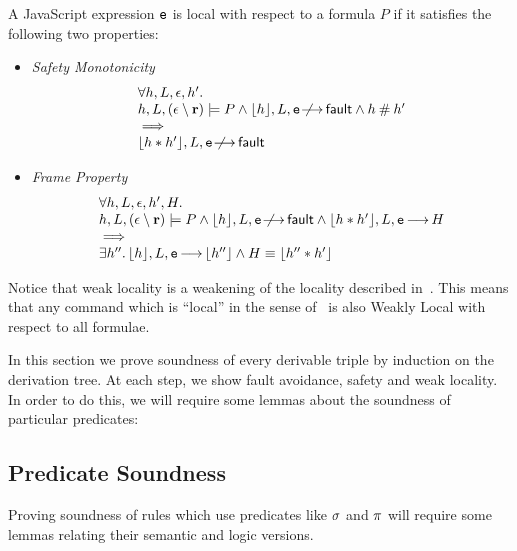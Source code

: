\documentclass{article}
\begin{document}
\begin{defn}
        \label{defn:locality}
A JavaScript expression $\mbox{\texttt{{\upshape e}}}$ is local with respect to a formula $P$ if it satisfies the following two properties:
\begin{itemize}
        \item \emph{Safety Monotonicity}
                \[ \begin{array}{l}
                        \forall h,L,\env,h'\st\\
                        h,L,(\env\setminus \rv) \satisfies P \land \heval{h},L,\js{e}\not\!\!\!\!\levalsto\fault \land h\disj h' \\
                        \implies\\
                        \heval{h\sep h'},L,\js{e}\not\!\!\!\!\levalsto\fault
                \end{array}
                \]
        \item \emph{Frame Property}
                \[ \begin{array}{l}
                        \forall h,L,\epsilon,h',H\mathpunct{.}\\
                        h,L,(\epsilon\setminus {\ensuremath{\mathrm{\textbf{r}}}}) \models P \land \lfloor h\rfloor,L,\mbox{\texttt{{\upshape e}}}\not\!\!\!\!{\,\longrightarrow\,}{\mathsf{fault}} \land \lfloor h\mathbin{*} h'\rfloor,L,\mbox{\texttt{{\upshape e}}}{\,\longrightarrow\,} H \\
                        \implies \\
                        \exists h'' \mathpunct{.} \lfloor h\rfloor,L,\mbox{\texttt{{\upshape e}}}{\,\longrightarrow\,} \lfloor h''\rfloor \land H\equiv \lfloor h''\mathbin{*} h'\rfloor
                \end{array}
                \]
\end{itemize}
\end{defn}

Notice that weak locality is a weakening of the locality described in~\cite{Yang02asemantic}. This means that any command which is ``local'' in the sense of~\cite{Yang02asemantic} is also Weakly Local with respect to all formulae.

In this section we prove soundness of every derivable triple by induction on the derivation tree. At each step, we show fault avoidance, safety and weak locality. In order to do this, we will require some lemmas about the soundness of particular predicates:

\subsection{Predicate Soundness}

Proving soundness of rules which use predicates like $\sigma$ and $\pi$ will require some lemmas relating their semantic and logic versions.
\end{document}
